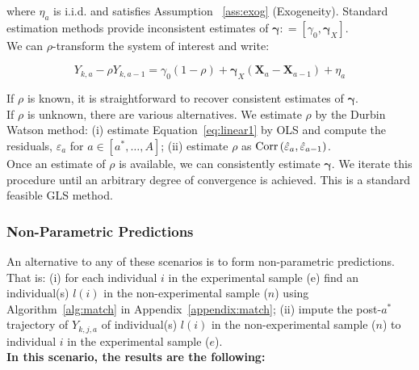 \noindent where $\eta_{a}$ is i.i.d. and satisfies Assumption ~\ref{ass:exog} (Exogeneity). Standard estimation methods provide inconsistent estimates of $\bm{\gamma} : = [\gamma_{0}, \bm{\gamma}_{X}]$.\\

\noindent We can $\rho$-transform the system of interest and write: 


\begin{equation}
Y_{k,a} - \rho Y_{k,a-1} = \gamma_{0} \left( 1 - \rho \right) + \bm{\gamma}_{X} \left( \bm{X}_{a} - \bm{X}_{a-1} \right) + \eta_{a}
\end{equation}

\noindent If $\rho$ is known, it is straightforward to recover consistent estimates of $\bm{\gamma}$.\\

\noindent If $\rho$ is unknown, there are various alternatives. We estimate $\rho$ by the Durbin Watson method: (i) estimate Equation~\eqref{eq:linear1} by OLS and compute the residuals, $\varepsilon_{a}$ for $a \in [a^*, \ldots, A]$; (ii) estimate $\rho$ as  $\operatorname{Corr} \left( \hat{\varepsilon}_{a}, \hat{\varepsilon}_{a-1} \right)$.\\ 

\noindent Once an estimate of $\rho$ is available, we can consistently estimate $\bm{\gamma}$. We iterate this procedure until an arbitrary degree of convergence is achieved. This is a standard feasible GLS method.\\ 

\noindent 



\subsubsection{Non-Parametric Predictions}

\noindent An alternative to any of these scenarios is to form non-parametric predictions. That is: (i) for each individual $i$ in the experimental sample (e) find an individual(s) $l(i)$ in the non-experimental sample ($n$) using Algorithm~\ref{alg:match} in Appendix~\ref{appendix:match}; (ii) impute the post-$a^*$ trajectory of $Y_{k,j,a}$ of individual(s) $l(i)$ in the non-experimental sample ($n$) to individual $i$ in the experimental sample ($e$).\\

\noindent \textbf{In this scenario, the results are the following:}\\

